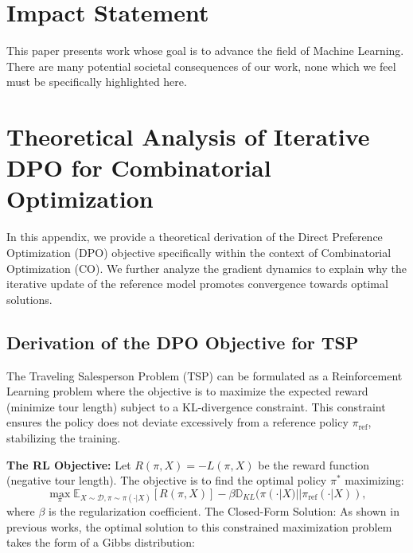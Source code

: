 \documentclass{article}
\theoremstyle{plain}
\theoremstyle{definition}
\theoremstyle{remark}
\begin{document}
\section*{Impact Statement}

This paper presents work whose goal is to advance the field of Machine
Learning. There are many potential societal consequences of our work, none
which we feel must be specifically highlighted here.



\newpage
\appendix
\onecolumn
\section{ Theoretical Analysis of Iterative DPO for Combinatorial Optimization}
In this appendix, we provide a theoretical derivation of the Direct Preference Optimization (DPO) objective specifically within the context of Combinatorial Optimization (CO). We further analyze the gradient dynamics to explain why the iterative update of the reference model promotes convergence towards optimal solutions.

\subsection{Derivation of the DPO Objective for TSP}
The Traveling Salesperson Problem (TSP) can be formulated as a Reinforcement Learning problem where the objective is to maximize the expected reward (minimize tour length) subject to a KL-divergence constraint. This constraint ensures the policy does not deviate excessively from a reference policy $\pi_{\text{ref}}$, stabilizing the training.

\textbf{The RL Objective:} Let $R(\pi, X) = -L(\pi, X)$ be the reward function (negative tour length). The objective is to find the optimal policy $\pi^*$ maximizing:
\begin{equation}
    \max_{\pi} \mathbb{E}_{X \sim \mathcal{D}, \pi \sim \pi(\cdot|X)} \left[ R(\pi, X) \right] - \beta \mathbb{D}_{KL}(\pi(\cdot|X) || \pi_{\text{ref}}(\cdot|X)),
\end{equation}
where $\beta$ is the regularization coefficient.
The Closed-Form Solution: As shown in previous works, the optimal solution to this constrained maximization problem takes the form of a Gibbs distribution:
\end{document}
